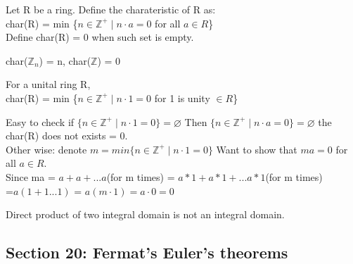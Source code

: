 \documentclass{article}
\newcommand\Z{\ensuremath{\mathbb{Z}}}
\begin{document}
\begin{Def}
    Let R be a ring. Define the charateristic of R as:
    \\ char(R) = min \{$n \in \Z^+ \mid  n \cdot a = 0$ for all $a\in R$\}
    \\Define char(R) = 0 when such set is empty.
\end{Def}

\begin{Example}
    char($\Z_n$) = n, char($\Z$) = 0
\end{Example}
\begin{theorem}
    For a unital ring R,
    \\char(R) = min \{$n \in \Z^+ \mid  n \cdot 1 = 0$ for 1 is unity $\in R$\}
\end{theorem}

\begin{Proof}
   Easy to check if $\{n \in \Z^+ \mid n\cdot 1 = 0\} = \varnothing$ Then $\{n \in \Z^+ \mid n\cdot a = 0\} =\varnothing$ the char(R) does not exists = 0.
   \\Other wise: denote $m = min \{n \in \Z^+ \mid n\cdot 1 = 0\} $ Want to show that $ma = 0 $ for all $a\in R$.
   \\Since ma = $a+a+...a $(for m times) = $a*1 + a*1 +...a*1$(for m times)
   \\ =$ a(1+1...1)$ = $a(m \cdot 1) = a \cdot 0 = 0$
\end{Proof}

\begin{note}
    Direct product of two integral domain is not an integral domain. 
\end{note}
\newpage

\subsection{Section 20: Fermat's Euler's theorems}
\end{document}
